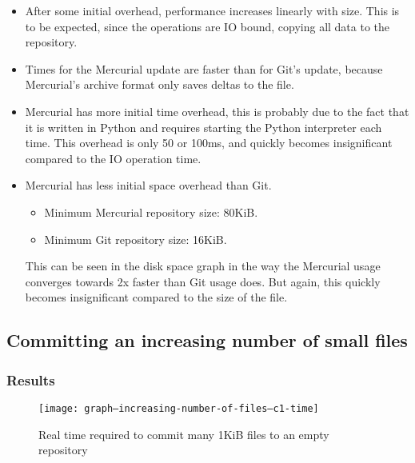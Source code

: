\documentclass[a4paper]{article}
\begin{document}
\begin{itemize}

    \item After some initial overhead, performance increases linearly with size.
        This is to be expected, since the operations are IO bound, copying all
        data to the repository.

    \item Times for the Mercurial update are faster than for Git's update,
        because Mercurial's archive format only saves deltas to the file.

    \item Mercurial has more initial time overhead, this is probably due to the
        fact that it is written in Python and requires starting the Python
        interpreter each time. This overhead is only 50 or 100ms, and quickly
        becomes insignificant compared to the IO operation time.

    \item Mercurial has less initial space overhead than Git.

        \begin{itemize}
            \setlength{\itemsep}{0pt}
            \setlength{\parskip}{0pt}
            \setlength{\parsep}{0pt}
            \item Minimum Mercurial repository size: 80KiB.
            \item Minimum Git repository size: 16KiB.
        \end{itemize}

        This can be seen in the disk space graph in the way the Mercurial usage
        converges towards 2x faster than Git usage does. But again, this quickly
        becomes insignificant compared to the size of the file.

\end{itemize}

\fi

\subsection{Committing an increasing number of small files}

\subsubsection{Results}

\begin{figure}[p]
  \caption{Real time required to commit many 1KiB files to an empty repository}
  \label{fig:graph--increasing-number-of-files--c1-time}
  \centering
    \texttt{[image: graph--increasing-number-of-files--c1-time]}
\end{figure}
\end{document}
